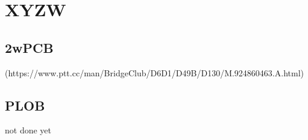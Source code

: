 \section{XYZW}

\subsection{2wPCB}

(https://www.ptt.cc/man/BridgeClub/D6D1/D49B/D130/M.924860463.A.html)


\subsection{PLOB}

not done yet 
